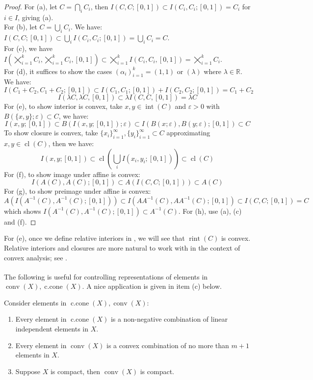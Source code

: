 \begin{proof}For (a), let $C=\bigcap_iC_i$, then $I(C,C;[0,1])\subset I(C_i,C_i;[0,1])=C_i$ for $i\in I$, giving (a).\\
	For (b), let $C=\bigcup_iC_i$. We have: $I(C,C;[0,1])\subset \bigcup_iI(C_i,C_i;[0,1])=\bigcup_iC_i=C$.\\
	For (c), we have $I(\bigtimes_{i=1}^kC_i,\bigtimes_{i=1}^kC_i,[0,1])\subset \bigtimes_{i=1}^kI(C_i,C_i,[0,1])=\bigtimes_{i=1}^kC_i$.\\
	For (d), it suffices to show the cases $(\alpha_i)_{i=1}^k=(1,1)$ or $(\lambda)$ where $\lambda\in \mathbb{R}$. We have:
	\[
		I(C_1+C_2,C_1+C_2;[0,1])\subset I(C_1,C_1;[0,1])+I(C_2,C_2;[0,1])=C_1+C_2
	\]
	\[
		I(\lambda C,\lambda C,[0,1])\subset\lambda I(C,C,[0,1])=\lambda C
	\]
	For (e), to show interior is convex, take $x,y\in \operatorname{int}(C)$ and $\varepsilon>0$ with $B(\{x, y\};\varepsilon)\subset C$, we have:
	\[
		I(x, y;[0, 1])\subset B(I(x, y;[0, 1]);\varepsilon)\subset I(B(x;\varepsilon),B(y;\varepsilon); [0, 1])\subset C
	\]
	To show closure is convex, take $\{x_i\}_{i=1}^\infty,\{y_i\}_{i=1}^\infty\subset C$ approximating $x,y\in \operatorname{cl}(C)$, then we have:
	\[
		I(x,y;[0,1])\subset \operatorname{cl}\left(\bigcup_{i}I(x_i,y_i;[0,1])\right)\subset \operatorname{cl}(C)
	\]
	For (f), to show image under affine is convex:
	\[
		I(A(C),A(C);[0,1])\subset A(I(C,C;[0,1]))\subset A(C)
	\]
	For (g), to show preimage under affine is convex:
	\[
		A\left(I\left(A^{-1}(C),A^{-1}(C);[0,1]\right)\right)\subset I\left(AA^{-1}(C),AA^{-1}(C);[0,1]\right)\subset I(C,C;[0,1])=C
	\]
	which shows $I(A^{-1}(C),A^{-1}(C);[0,1])\subset A^{-1}(C)$. For (h), use (a), (c) and (f).
\end{proof}

\begin{rmrk}
	For (e), once we define relative interiors in , we will see that $\operatorname{rint}(C)$ is convex. Relative interiors and closures are more natural to work with in the context of convex analysis; see .
\end{rmrk}

\paragraph{}The following is useful for controlling representations of elements in $\operatorname{conv}(X),\operatorname{c.cone}(X)$. A nice application is given in item (c) below.

\begin{prop}\label{prop:011-cara}
	Consider elements in $\operatorname{c.cone}(X),\operatorname{conv}(X)$:
	\begin{enumerate}[label=(\alph*)]
		\item Every element in $\operatorname{c.cone}(X)$ is a non-negative combination of linear independent elements in $X$.
		\item Every element in $\operatorname{conv}(X)$ is a convex combination of no more than $m+1$ elements in $X$.
		\item Suppose $X$ is compact, then $\operatorname{conv}(X)$ is compact.
	\end{enumerate}
\end{prop}

